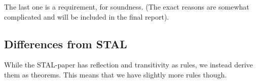The last one is a requirement, for soundness. (The exact reasons are somewhat complicated and will be included in the final report).

\subsection{Differences from STAL}
While the STAL-paper has reflection and transitivity as rules, we instead derive
them as theorems. This means that we have slightly more rules though.
